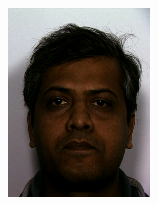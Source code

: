 \begin{figure}[h]
     \centering
     \begin{subfigure}[b]{0.18\textwidth}
         \centering
         \includegraphics[width=\textwidth]{images/results/base_st/dd109.color.d3_x.png}
     \end{subfigure}
     \hfill
     \begin{subfigure}[b]{0.18\textwidth}
         \centering

\end{subfigure}
\end{figure}
